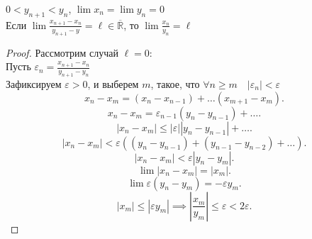 \documentclass[11pt, oneside]{article}   	%
\begin{document}
    \begin{theorem}
         $0 < y_{n+1} < y_n$, $\lim x_n = \lim y_n = 0$\\
         Если $\lim \frac{x_{n+1}-x_n}{y_{n+1}-y} = \ell\in \overline{\mathbb{R}}$, то $\lim \frac{x_n}{y_n} = \ell$\\
         \begin{proof}
            Рассмотрим случай $\ell = 0$:\\
            Пусть $\varepsilon_n = \frac{x_{n+1}-x_n}{y_{n+1}-y_n}$ \\
            Зафиксируем $\varepsilon > 0$, и выберем  $m$, такое, что  $\forall{n\ge m}\quad |\varepsilon_n| < \varepsilon$\\
            \[ x_n - x_m = (x_n-x_{n-1}) + \ldots (x_{m+1}-x_m) .\]
            \[ x_n - x_m = \varepsilon_{n-1}(y_n-y_{n-1}) + \ldots .\]
            \[ |x_n - x_m| \le |\varepsilon| |y_n-y_{n-1}| + \ldots  .\]
            \[ |x_n-x_m| < \varepsilon\left( (y_{n}-y_{n-1}) + (y_{n-1}-y_{n-2}) + \ldots \right)  .\]
            \[ |x_n - x_m| < \varepsilon\left| y_n-y_m \right|  .\]
            \[ \lim |x_n-x_{m}| = |x_m| .\]
            \[ \lim \varepsilon(y_n-y_m) = -\varepsilon y_m .\]
            \[ |x_m| \le |\varepsilon y_m| \implies \left|\frac{x_m}{y_m}\right| \le \varepsilon < 2\varepsilon .\] 
         \end{proof}
    \end{theorem}
\end{document}
